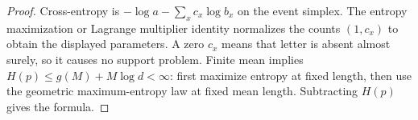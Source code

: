 \begin{proof}
Cross-entropy is $-\log a-\sum_xc_x\log b_x$ on the event simplex.
The entropy maximization or Lagrange multiplier identity normalizes the
counts $(1,c_x)$ to obtain the displayed parameters. A zero $c_x$ means
that letter is absent almost surely, so it causes no support problem.
Finite mean implies $H(p)\le g(M)+M\log d<\infty$: first maximize
entropy at fixed length, then use the geometric maximum-entropy law at
fixed mean length. Subtracting $H(p)$ gives the formula.
\end{proof}
